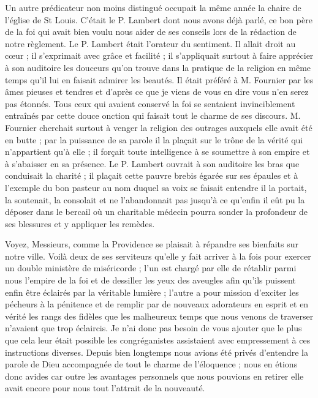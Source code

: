 Un autre prédicateur non moins distingué occupait la même année la chaire de l'église de St Louis. C'était le P. Lambert dont nous avons déjà parlé, ce bon père de la foi qui avait bien voulu nous aider de ses conseils lors de la rédaction de notre règlement. Le P. Lambert était l'orateur du sentiment. Il allait droit au cœur ; il s'exprimait avec grâce et facilité ; il s'appliquait surtout à faire apprécier à son auditoire les douceurs qu'on
trouve dans la pratique de la religion en même temps qu'il lui en faisait admirer les beautés. Il était préféré à M. Fournier par les âmes pieuses et tendres et d'après ce que je viens de vous en dire vous n'en serez pas étonnés. Tous ceux qui avaient conservé la foi se sentaient invinciblement entraînés par cette douce onction qui faisait tout le charme de ses discours. M. Fournier cherchait surtout à venger la religion des outrages auxquels elle avait été en butte ; par la puissance de sa parole il la plaçait sur le trône de la vérité qui n'appartient qu'à elle ; il forçait toute intelligence à se soumettre à son empire et à s'abaisser en sa présence. Le P. Lambert ouvrait à son auditoire les bras que conduisait la charité ; il plaçait cette pauvre brebis égarée sur ses épaules et à l'exemple du bon pasteur au nom duquel sa voix se faisait entendre il la portait, la soutenait, la consolait et ne l'abandonnait pas jusqu'à ce qu'enfin il eût pu la déposer dans le bercail où un charitable médecin pourra sonder la profondeur de ses blessures et y appliquer les remèdes.

Voyez, Messieurs, comme la Providence se plaisait à répandre ses bienfaits sur notre ville. Voilà deux de ses serviteurs qu'elle y fait arriver à la fois pour exercer un double ministère de miséricorde ; l'un est chargé par elle de rétablir parmi nous l'empire de la foi et de dessiller les yeux des aveugles afin qu'ils puissent enfin être éclairés par la véritable lumière ; l'autre a pour mission d'exciter les pécheurs à la pénitence et de remplir par de nouveaux adorateurs en esprit et en vérité les rangs des fidèles que les malheureux temps que nous venons de traverser n'avaient que trop éclaircis. Je
n'ai donc pas besoin de vous ajouter que le plus que cela leur était possible les congréganistes assistaient avec empressement à ces instructions diverses. Depuis bien longtemps nous avions été privés d'entendre la parole de Dieu accompagnée de tout le charme de l'éloquence ; nous en étions donc avides car outre les avantages personnels que nous pouvions en retirer elle avait encore pour nous tout l'attrait de la nouveauté.

